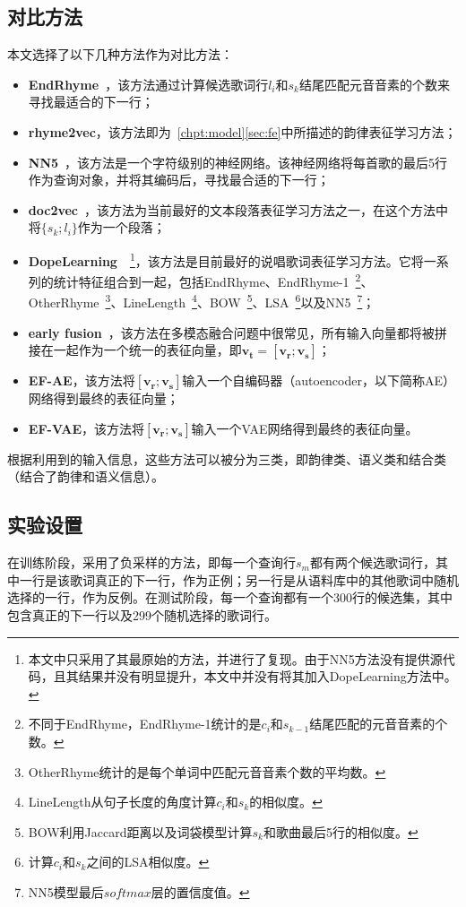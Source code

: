 \subsection{对比方法} \label{sec:nextlinebaseline}
本文选择了以下几种方法作为对比方法：
\begin{itemize}
  \item{\bf EndRhyme}~\autocite{Malmi2016dopelearning}，该方法通过计算候选歌词行$l_i$和$s_k$结尾匹配元音音素的个数来寻找最适合的下一行；
  \item{\bf rhyme2vec}，该方法即为~\ref{chpt:model}\ref{sec:fe}中所描述的韵律表征学习方法；
  \item{\bf NN5}~\autocite{Malmi2016dopelearning}，该方法是一个字符级别的神经网络。该神经网络将每首歌的最后5行作为查询对象，并将其编码后，寻找最合适的下一行；
  \item{\bf doc2vec}~\autocite{quoc2014distributed}，该方法为当前最好的文本段落表征学习方法之一，在这个方法中将$\{s_k;l_i\}$作为一个段落；
  \item{\bf DopeLearning}~\autocite{Malmi2016dopelearning}~\footnote{本文中只采用了其最原始的方法，并进行了复现。由于NN5方法没有提供源代码，且其结果并没有明显提升，本文中并没有将其加入DopeLearning方法中。}，该方法是目前最好的说唱歌词表征学习方法。它将一系列的统计特征组合到一起，包括EndRhyme、EndRhyme-1~\footnote{不同于EndRhyme，EndRhyme-1统计的是$c_i$和$s_{k-1}$结尾匹配的元音音素的个数。}、OtherRhyme~\footnote{OtherRhyme统计的是每个单词中匹配元音音素个数的平均数。}、LineLength~\footnote{LineLength从句子长度的角度计算$c_i$和$s_k$的相似度。}、BOW~\footnote{BOW利用Jaccard距离以及词袋模型计算$s_k$和歌曲最后5行的相似度。}、LSA~\footnote{计算$c_i$和$s_k$之间的LSA相似度。}以及NN5~\footnote{NN5模型最后$softmax$层的置信度值。}；
  \item{\bf early fusion}~\autocite{Malmi2016dopelearning, chen2017visual}，该方法在多模态融合问题中很常见，所有输入向量都将被拼接在一起作为一个统一的表征向量，即$\bm {v_t}=[\bm{v_r};\bm{v_s}]$；
  \item{\bf EF-AE}，该方法将$[\bm{v_r};\bm{v_s}]$输入一个自编码器（autoencoder，以下简称AE）网络得到最终的表征向量；
  \item{\bf EF-VAE}，该方法将$[\bm{v_r};\bm{v_s}]$输入一个VAE网络得到最终的表征向量。
\end{itemize}
根据利用到的输入信息，这些方法可以被分为三类，即韵律类、语义类和结合类（结合了韵律和语义信息）。\par

\subsection{实验设置}
在训练阶段，采用了负采样的方法，即每一个查询行$s_m$都有两个候选歌词行，其中一行是该歌词真正的下一行，作为正例；另一行是从语料库中的其他歌词中随机选择的一行，作为反例。在测试阶段，每一个查询都有一个300行的候选集，其中包含真正的下一行以及299个随机选择的歌词行。\par

